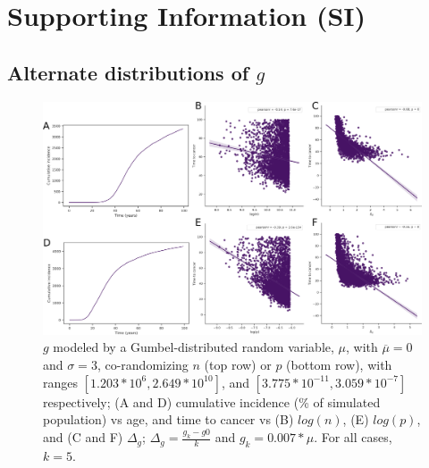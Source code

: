 \documentclass[10pt,twocolumn,twoside]{article}
\begin{document}
\newpage
\printbibliography


\section*{Supporting Information (SI)}
	\renewcommand{\thesubsection}{S\arabic{subsection}}
	\setcounter{subsection}{0} 	

	\subsection{Alternate distributions of $g$}\label{S1 Figures}
		\renewcommand{\thefigure}{S1.\arabic{figure}}
		\setcounter{figure}{0} 	
		\begin{figure}[tbhp]
			\centering
			\includegraphics[width=\linewidth, keepaspectratio=true]{figS1-1.png}
			\caption{$g$ modeled by a Gumbel-distributed random variable, $\mu$, with $\overline{\mu}=0$ and $\sigma=3$, co-randomizing $n$ (top row) or $p$ (bottom row), with ranges $[1.203*10^{6}, 2.649*10^{10}]$, and $[3.775*10^{-11}, 3.059*10^{-7}]$ respectively; (A and D) cumulative incidence (\% of simulated population) vs age, and time to cancer vs (B) $log(n)$, (E) $log(p)$, and (C and F) $\Delta_{g}$; $\Delta_{g} = \frac{g_{k}-g{0}}{k}$ and $g_{k} = 0.007*\mu$. For all cases, $k=5$.}
			\label{figS1.1}
		\end{figure}
\end{document}
